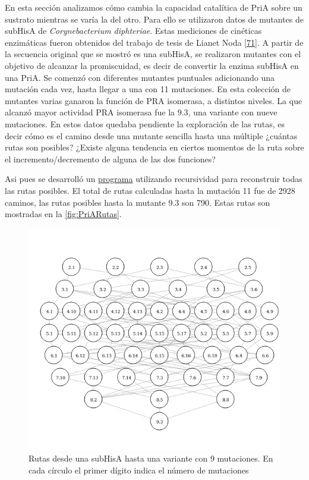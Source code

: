 \documentclass[12pt,twoside]{reedthesis}
\begin{document}
  En esta sección analizamos cómo cambia la capacidad catalítica de PriA
  sobre un sustrato mientras se varía la del otro. Para ello se utilizaron
  datos de mutantes de subHisA de \emph{Corynebacterium diphteriae}. Estas
  mediciones de cinéticas enzimáticas fueron obtenidos del trabajo de
  tesis de Lianet Noda {[}\protect\hyperlink{ref-noda_tesis_2012}{71}{]}.
  A partir de la secuencia original que se mostró es una subHisA, se
  realizaron mutantes con el objetivo de alcanzar la promiscuidad, es
  decir de convertir la enzima subHisA en una PriA. Se comenzó con
  diferentes mutantes puntuales adicionando una mutación cada vez, hasta
  llegar a una con 11 mutaciones. En esta colección de mutantes varias
  ganaron la función de PRA isomerasa, a distintos niveles. La que alcanzó
  mayor actividad PRA isomerasa fue la \(9.3\), una variante con nueve
  mutaciones. En estos datos quedaba pendiente la exploración de las
  rutas, es decir cómo es el camino desde una mutante sencilla hasta una
  múltiple ¿cuántas rutas son posibles? ¿Existe alguna tendencia en
  ciertos momentos de la ruta sobre el incremento/decremento de alguna de
  las dos funciones?
  
  Asi pues se desarrolló un
  \href{https://github.com/nselem/perlas/tree/master/LiaTrayectory}{programa}
  utilizando recursividad para reconstruir todas las rutas posibles. El
  total de rutas calculadas hasta la mutación 11 fue de 2928 caminos, las
  rutas posibles hasta la mutante 9.3 son 790. Estas rutas son mostradas
  en la \autoref{fig:PriARutas}.
  
  \begin{figure}[h!tbp]
  \centering
  \includegraphics[angle = 0,scale = 0.6]{conclusion/Solocirculos.png}
  \caption[Rutas desde una subHisA hasta una variante con 9 mutaciones]{\footnotesize{Rutas desde una subHisA hasta una variante con 9 mutaciones. En cada círculo el primer dígito indica el número de mutaciones}}
  \label{fig:PriARutas}
  \end{figure}
  
\end{document}
